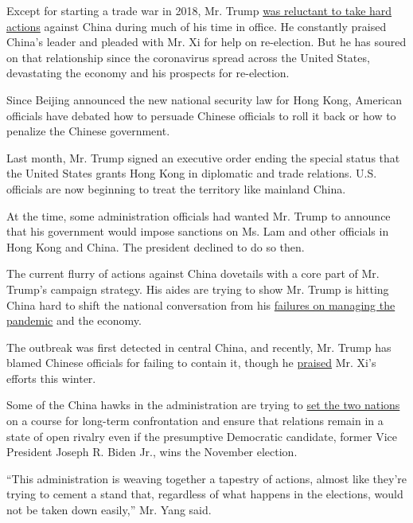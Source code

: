 Except for starting a trade war in 2018, Mr. Trump
\href{https://www.nytimes3xbfgragh.onion/2020/06/18/us/politics/trump-china-bolton.html}{was
reluctant to take hard actions} against China during much of his time in
office. He constantly praised China's leader and pleaded with Mr. Xi for
help on re-election. But he has soured on that relationship since the
coronavirus spread across the United States, devastating the economy and
his prospects for re-election.

Since Beijing announced the new national security law for Hong Kong,
American officials have debated how to persuade Chinese officials to
roll it back or how to penalize the Chinese government.

Last month, Mr. Trump signed an executive order ending the special
status that the United States grants Hong Kong in diplomatic and trade
relations. U.S. officials are now beginning to treat the territory like
mainland China.

At the time, some administration officials had wanted Mr. Trump to
announce that his government would impose sanctions on Ms. Lam and other
officials in Hong Kong and China. The president declined to do so then.

The current flurry of actions against China dovetails with a core part
of Mr. Trump's campaign strategy. His aides are trying to show Mr. Trump
is hitting China hard to shift the national conversation from his
\href{https://www.nytimes3xbfgragh.onion/2020/08/06/us/coronavirus-us.html}{failures
on managing the pandemic} and the economy.

The outbreak was first detected in central China, and recently, Mr.
Trump has blamed Chinese officials for failing to contain it, though he
\href{https://twitter.com/realdonaldtrump/status/1243407157321560071?lang=en}{praised}
Mr. Xi's efforts this winter.

Some of the China hawks in the administration are trying to
\href{https://www.nytimes3xbfgragh.onion/2020/07/25/world/asia/us-china-trump-xi.html}{set
the two nations} on a course for long-term confrontation and ensure that
relations remain in a state of open rivalry even if the presumptive
Democratic candidate, former Vice President Joseph R. Biden Jr., wins
the November election.

``This administration is weaving together a tapestry of actions, almost
like they're trying to cement a stand that, regardless of what happens
in the elections, would not be taken down easily,'' Mr. Yang said.

